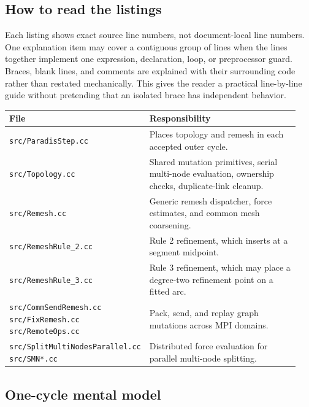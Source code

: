 \documentclass[11pt]{article}
\newcommand{\srcfile}[1]{\texorpdfstring{\nolinkurl{#1}}{#1}}
\begin{document}
\subsection{How to read the listings}

Each listing shows exact source line numbers, not document-local line
numbers. One explanation item may cover a contiguous group of lines when the
lines together implement one expression, declaration, loop, or preprocessor
guard. Braces, blank lines, and comments are explained with their surrounding
code rather than restated mechanically. This gives the reader a practical
line-by-line guide without pretending that an isolated brace has independent
behavior.

\begin{longtable}{@{}p{0.40\linewidth}p{0.54\linewidth}@{}}
\toprule
File & Responsibility \\
\midrule
\endhead
\srcfile{src/ParadisStep.cc} & Places topology and remesh in each accepted outer cycle. \\
\srcfile{src/Topology.cc} & Shared mutation primitives, serial multi-node evaluation, ownership checks, duplicate-link cleanup. \\
\srcfile{src/Remesh.cc} & Generic remesh dispatcher, force estimates, and common mesh coarsening. \\
\srcfile{src/RemeshRule_2.cc} & Rule 2 refinement, which inserts at a segment midpoint. \\
\srcfile{src/RemeshRule_3.cc} & Rule 3 refinement, which may place a degree-two refinement point on a fitted arc. \\
\srcfile{src/CommSendRemesh.cc}\newline
\srcfile{src/FixRemesh.cc}\newline
\srcfile{src/RemoteOps.cc} & Pack, send, and replay graph mutations across MPI domains. \\
\srcfile{src/SplitMultiNodesParallel.cc}\newline
\srcfile{src/SMN*.cc} & Distributed force evaluation for parallel multi-node splitting. \\
\bottomrule
\end{longtable}

\subsection{One-cycle mental model}

\begin{center}
\end{center}
\end{document}
